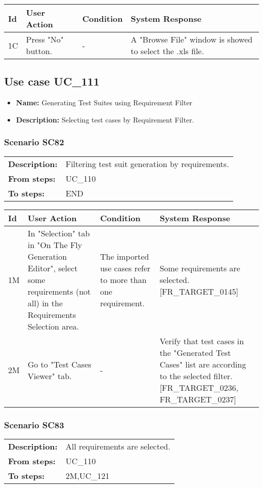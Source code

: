 \documentclass[a4paper,11pt]{article}
\newcommand{\bl}{\\ \hline}
\begin{document}
\begin{tabular}{|p{0.8in}|p{1.6in}|p{1.6in}|p{1.6in}|}
\hline
Id & User Action & Condition & System Response  \bl 
1C & Press "No" button. & - & A "Browse File" window is showed to select the .xls file.
					 \bl 
\end{tabular}
\subsection*{Use case UC_111}
\begin{itemize}
\item {\bf Name: }Generating Test Suites using Requirement Filter
\item {\bf Description: }Selecting test cases by Requirement Filter.
			
\end{itemize}
\subsubsection*{Scenario SC82}
\begin{tabular}{p{1in}p{4in}}
{\bf Description:} & Filtering test suit generation by requirements.
				 \\
{\bf From steps:} & UC_110#2M \\
{\bf To steps:} & END \\
\end{tabular}
 
\begin{tabular}{|p{0.8in}|p{1.6in}|p{1.6in}|p{1.6in}|}
\hline
Id & User Action & Condition & System Response  \bl 
1M & In "Selection" tab in "On The Fly Generation Editor",
						select some requirements (not all) in the Requirements Selection
						area.  & The imported use cases refer to more than one
						requirement. & Some requirements are selected. [FR_TARGET_0145]
					 \bl 
2M & Go to "Test Cases Viewer" tab. & - &  Verify that test cases in the "Generated Test Cases"
						list are according to the selected filter. [FR_TARGET_0236,
						FR_TARGET_0237] \bl 
\end{tabular}
\subsubsection*{Scenario SC83}
\begin{tabular}{p{1in}p{4in}}
{\bf Description:} & All requirements are selected. \\
{\bf From steps:} & UC_110#2M \\
{\bf To steps:} & 2M,UC_121#1M \\
\end{tabular}
 
\end{document}
